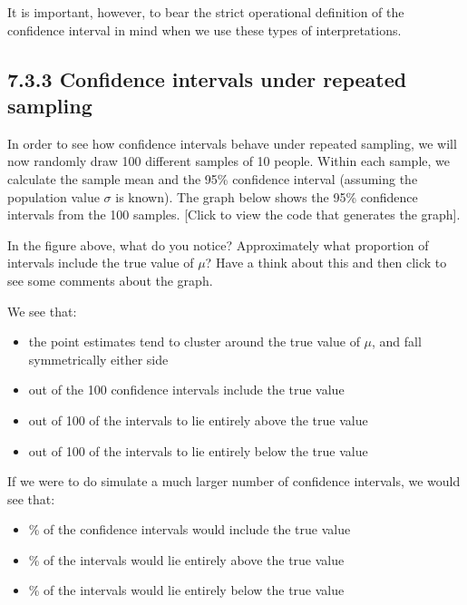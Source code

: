 \documentclass[letterpaper,10pt,english]{jupyterBook}
\begin{document}
\sphinxAtStartPar
It is important, however, to bear the strict operational definition of the confidence interval in mind when we use these types of interpretations.


\subsection{7.3.3 Confidence intervals under repeated sampling}
\label{\detokenize{07.d. Frequentist I:confidence-intervals-under-repeated-sampling}}
\sphinxAtStartPar
In order to see how confidence intervals behave under repeated sampling, we will now randomly draw 100 different samples of 10 people. Within each sample, we calculate the sample mean and the 95\% confidence interval (assuming the population value \(\sigma\) is known).  The graph below shows the 95\% confidence intervals from the 100 samples. {[}Click to view the code that generates the graph{]}.

\noindent{}

\sphinxAtStartPar
In the figure above, what do you notice? Approximately what proportion of intervals include the true value of \(\mu\)? Have a think about this and then click to see some comments about the graph.

\sphinxAtStartPar
We see that:
\begin{itemize}
\item {} 
\sphinxAtStartPar
the point estimates tend to cluster around the true value of \(\mu\), and fall symmetrically either side

\item {} 
 out of the 100 confidence intervals include the true value

\item {} 
 out of 100 of the intervals to lie entirely above the true value

\item {} 
 out of 100 of the intervals to lie entirely below the true value

\end{itemize}

\sphinxAtStartPar
If we were to do simulate a much larger number of confidence intervals, we would see that:
\begin{itemize}
\item {} 
\% of the confidence intervals would include the true value

\item {} 
\% of the intervals would lie entirely above the true value

\item {} 
\% of the intervals would lie entirely below the true value

\end{itemize}
\end{document}
